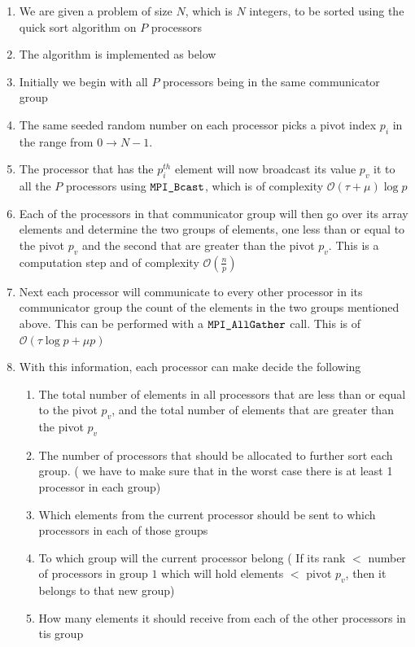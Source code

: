 \documentclass[twoside,11pt]{article}\usepackage{amsmath,amsfonts,amsthm,fullpage}
\begin{document}
\begin{enumerate}
\item
We are given a problem of size $N$, which is $N$ integers, to be sorted using the quick sort algorithm on $P$ processors
\item
The algorithm is implemented as below
\item
Initially we begin with all $P$ processors being in the same communicator group
\item
The same seeded random number on each processor picks a pivot index $p_i$ in the range from $0 \to N-1$.
\item
The processor that has the $p_i^{th}$ element will now broadcast its value $p_v$ it to all the $P$ processors using $\verb|MPI_Bcast|$, which is of complexity $ \mathcal{O}(\tau + \mu )\log p$
\item
Each of the processors in that communicator group will then go over its array elements and determine the two groups of elements, one less than or equal to the pivot $p_v$ and the second that are greater than the pivot $p_v$. This is a computation step and of complexity  $ \mathcal{O}(\frac{n}{p})$
\item
Next each processor will communicate to every other processor in its communicator group the count of the elements in the two groups mentioned above. This can be performed with a $\verb|MPI_AllGather|$ call. This is of  $ \mathcal{O}(\tau \log p + \mu p )$
\item
With this information, each processor can make decide the following 
\begin{enumerate}
\item
The total number of elements in all processors that are less than or equal to the pivot $p_v$, and the total number of elements that are greater than the pivot $p_v$
\item
The number of processors that should be allocated to further sort each group. ( we have to make sure that in the worst case there is at least 1 processor in each group)
\item
Which elements from the current processor should be sent to which processors in each of those groups
\item
To which group will the current processor belong ( If its rank $<$ number of processors in group $1$ which will hold elements $<$ pivot $p_v$, then it belongs to that new group)
\item
How many elements it should receive from each of the other processors in tis group
\end{enumerate}

\end{enumerate}
\end{document}
